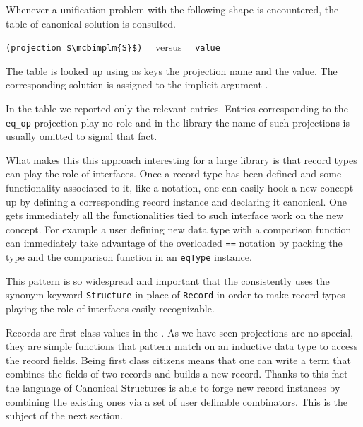 Whenever a unification problem with the following shape is encountered,
the table of canonical solution is consulted.
\begin{center}
\lstinline/(projection $\mcbimplm{S}$)/ ~~versus~~ \lstinline/value/
\end{center}
The table is looked up using as keys the projection name and the
value.  The corresponding solution is assigned to the implicit
argument .

In the table we reported only the relevant entries.  Entries
corresponding to the \lstinline/eq_op/ projection play no role
and in the \mcbMC{} library the name of such projections is
usually omitted to signal that fact.

What makes this this approach interesting for a large library is that
record types can play the role of interfaces.  Once a record type has
been defined and some functionality associated to it, like a notation,
one can easily hook a new concept up by defining a corresponding
record instance and declaring it canonical.  One gets immediately all
the functionalities tied to such interface work on the new concept.
For example a user defining new data type with a comparison function
can immediately take advantage of the overloaded \lstinline/==/
notation by packing the type and the comparison function in an
\lstinline/eqType/ instance.

This pattern is so widespread and important that the \mcbMC{}
consistently uses the synonym keyword \lstinline/Structure/ in place of
\lstinline/Record/ in order to make record types playing the role
of interfaces easily recognizable.

Records are first class values in the \mcbCIC{}.  As we have seen
projections are no special, they are simple functions that pattern
match on an inductive data type to access the record fields.  Being
first class citizens means that one can write a term that combines
the fields of two records and builds a new record.  Thanks to this
fact the language of Canonical Structures is able to forge
new record instances by combining the existing ones via a set
of user definable combinators.  This is the subject of the next
section.

\label{sec:receqtype}

